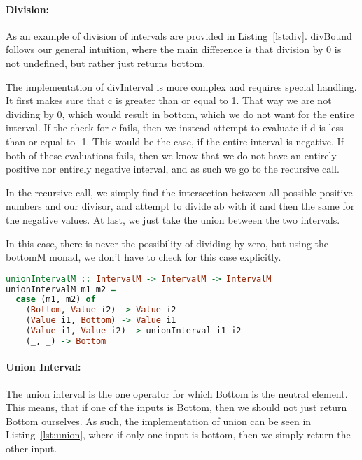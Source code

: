 \paragraph{Division:}
As an example of division of intervals are provided in Listing~\ref{lst:div}.
divBound follows our general intuition, where the main difference is that
division by 0 is not undefined, but rather just returns bottom. 

The implementation of divInterval is more complex and requires special
handling. It first makes sure that c is greater than or equal to 1. That way
we are not dividing by 0, which would result in bottom, which we do not want
for the entire interval. If the check for c fails, then we instead attempt to
evaluate if d is less than or equal to -1. This would be the case, if the
entire interval is negative. If both of these evaluations fails, then we know
that we do not have an entirely positive nor entirely negative interval, and as
such we go to the recursive call. 

In the recursive call, we simply find the intersection between all possible
positive numbers and our divisor, and attempt to divide ab with it and then the
same for the negative values. At last, we just take the union between the two
intervals.

In this case, there is never the possibility of dividing by zero, but using the
bottomM monad, we don't have to check for this case explicitly.


\begin{lstlisting}[language={haskell}, caption={Union interval implementation}, label={lst:union}]
unionIntervalM :: IntervalM -> IntervalM -> IntervalM
unionIntervalM m1 m2 =
  case (m1, m2) of
    (Bottom, Value i2) -> Value i2
    (Value i1, Bottom) -> Value i1
    (Value i1, Value i2) -> unionInterval i1 i2
    (_, _) -> Bottom
\end{lstlisting}
\paragraph{Union Interval:} The union interval is the one operator for which Bottom is the neutral element.
This means, that if one of the inputs is Bottom, then we should not just return
Bottom ourselves. As such, the implementation of union can be seen in
Listing~\ref{lst:union}, where if only one input is bottom, then we simply
return the other input.


